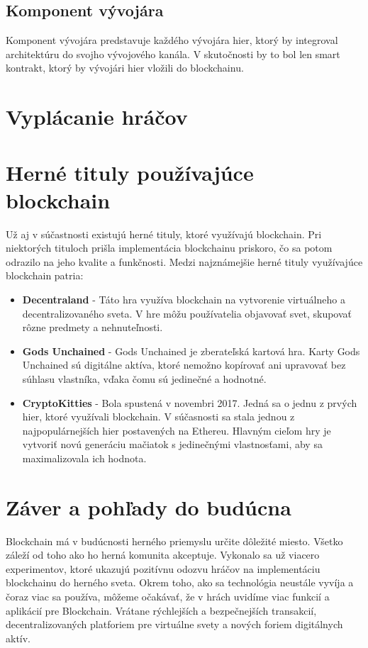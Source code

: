 \documentclass[10pt,twoside,slovak,a4paper]{article}
\begin{document}
\subsection{Komponent vývojára} \label{komponenty:vyvojar}
Komponent vývojára predstavuje každého vývojára hier, ktorý by integroval architektúru do svojho vývojového kanála. V skutočnosti by to bol len smart kontrakt, ktorý by vývojári hier vložili do blockchainu.\cite{Blockchain_architecture}




\section{Vyplácanie hráčov} \label{vyplacanie}


\section{Herné tituly používajúce blockchain}\label{hry}
Už aj v súčastnosti existujú herné tituly, ktoré využívajú blockchain. Pri niektorých tituloch prišla implementácia blockchainu priskoro, čo sa potom odrazilo na jeho kvalite a funkčnosti. Medzi najznámejšie herné tituly využívajúce blockchain patria:
\begin{itemize}
    \item \textbf{Decentraland} - Táto hra využíva blockchain na vytvorenie virtuálneho a decentralizovaného sveta. V hre môžu používatelia objavovať svet, skupovať rôzne predmety a nehnuteľnosti.
    \item \textbf{Gods Unchained} - Gods Unchained je zberateľská kartová hra. Karty Gods Unchained sú digitálne aktíva, ktoré nemožno kopírovať ani upravovať bez súhlasu vlastníka, vďaka čomu sú jedinečné a hodnotné.
    \item \textbf{CryptoKitties} - Bola spustená v novembri 2017. Jedná sa o jednu z prvých hier, ktoré využívali blockchain. V súčasnosti sa stala jednou z najpopulárnejších hier postavených na Ethereu. Hlavným cieľom hry je vytvoriť novú generáciu mačiatok s jedinečnými vlastnosťami, aby sa maximalizovala ich hodnota.
\end{itemize}

\section{Záver a pohľady do budúcna} \label{zaver}
Blockchain má v budúcnosti herného priemyslu určite dôležité miesto. Všetko záleží od toho ako ho herná komunita akceptuje. Vykonalo sa už viacero experimentov, ktoré ukazujú pozitívnu odozvu hráčov na implementáciu blockchainu do herného sveta. Okrem toho, ako sa technológia neustále vyvíja a čoraz viac sa používa, môžeme očakávať, že v hrách uvidíme viac funkcií a aplikácií pre Blockchain. Vrátane rýchlejších a bezpečnejších transakcií, decentralizovaných platforiem pre virtuálne svety a nových foriem digitálnych aktív.  




\end{document}

